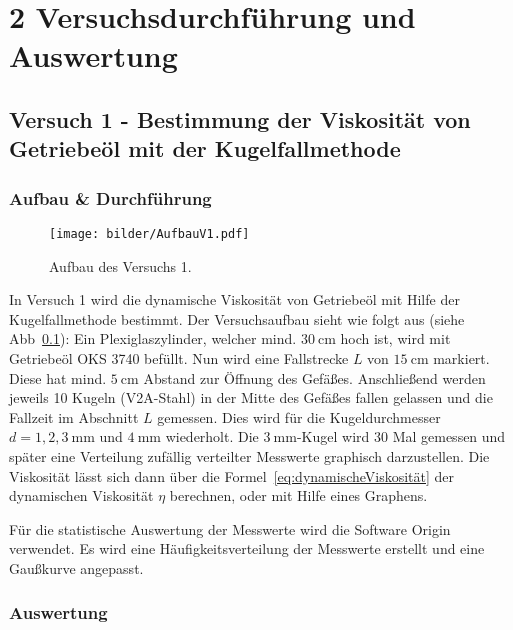 \chapter*{2 Versuchsdurchführung und Auswertung}
\setcounter{chapter}{2}
\setcounter{section}{0}
\setcounter{subsection}{0}
 
    \section{Versuch 1 - Bestimmung der Viskosität von Getriebeöl mit der Kugelfallmethode}
    \label{sec:Versuch1}
        
        \subsection{Aufbau \& Durchführung}

            \begin{figure}[H]
                \centering
                \texttt{[image: bilder/AufbauV1.pdf]}
                \caption{Aufbau des Versuchs 1.}
                \label{fig:AufbauV1}
            \end{figure}

            In Versuch 1 wird die dynamische Viskosität von Getriebeöl mit Hilfe der Kugelfallmethode bestimmt. Der Versuchsaufbau sieht wie folgt aus (siehe Abb~\ref{fig:AufbauV1}):
            Ein Plexiglaszylinder, welcher mind. $30\ \mathrm{cm}$ hoch ist, wird mit Getriebeöl OKS 3740 befüllt. Nun wird eine Fallstrecke $L$ von $15\ \mathrm{cm}$ markiert. Diese hat mind. $5\ \mathrm{cm}$ Abstand zur Öffnung des Gefäßes. Anschließend werden jeweils 10 Kugeln (V2A-Stahl) in der Mitte des Gefäßes fallen gelassen und die Fallzeit im Abschnitt $L$ gemessen. Dies wird für die Kugeldurchmesser $d = 1, 2, 3\ \mathrm{mm}$ und $4\ \mathrm{mm}$ wiederholt. Die $3\ \mathrm{mm}$-Kugel wird 30 Mal gemessen und später eine Verteilung zufällig verteilter Messwerte graphisch darzustellen.
            Die Viskosität lässt sich dann über die Formel~\ref{eq:dynamischeViskosität} der dynamischen Viskosität $\eta$ berechnen, oder mit Hilfe eines Graphens.

            Für die statistische Auswertung der Messwerte wird die Software Origin verwendet. Es wird eine Häufigkeitsverteilung der Messwerte erstellt und eine Gaußkurve angepasst.

        \subsection{Auswertung}

